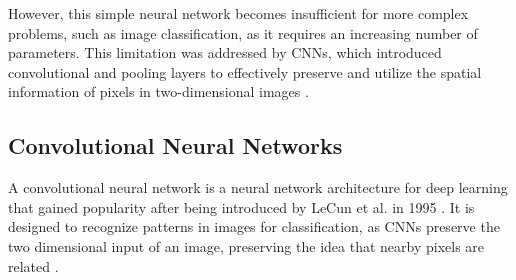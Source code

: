 However, this simple neural network becomes insufficient for more complex problems, such as image classification, as it requires an increasing number of parameters. This limitation was addressed by CNNs, which introduced convolutional and pooling layers to effectively preserve and utilize the spatial information of pixels in two-dimensional images \cite{zhang2023dive}.

\subsection{Convolutional Neural Networks}




 


 A convolutional neural network is a neural network architecture for deep learning that gained popularity after being introduced by LeCun et al. in 1995 \cite{lecun1995}. It is designed to recognize patterns in images for classification, as CNNs preserve the two dimensional input of an image, preserving the idea that nearby pixels are related \cite{zhang2023dive}. 




